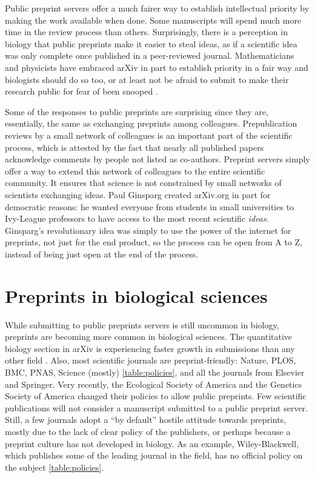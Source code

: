 \documentclass[letterpaper,twocolumn,superscriptaddress,showkeys]{revtex4}
\begin{document}
Public preprint servers offer a much fairer way to establish intellectual
priority by making the work available when done. Some manuscripts will spend
much more time in the review process than others. Surprisingly, there is a
perception in biology that public preprints make it easier to steal ideas, as if
a scientific idea was only complete once published in a peer-reviewed journal.
Mathematicians and physicists have embraced arXiv in part to establish priority
in a fair way and biologists should do so too, or at least not be afraid to
submit to make their research public for fear of been snooped \cite{cal12}.

Some of the responses to public preprints are surprising since they are,
essentially, the same as exchanging preprints among colleagues.  Prepublication
reviews by a small network of colleagues is an important part of the scientific
process, which is attested by the fact that nearly all published papers
acknowledge comments by people not listed as co-authors.  Preprint servers
simply offer a way to extend this network of colleagues to the entire scientific
community. It ensures that science is not constrained by small networks of
scientists exchanging ideas.  Paul Ginsparg created arXiv.org in part for
democratic reasons: he wanted everyone from students in small universities to
Ivy-League professors to have access to the most recent scientific \emph{ideas}.
Ginsparg's revolutionary idea was simply to use the power of the internet for
preprints, not just for the end product, so the process can be open from A to Z,
instead of being just open at the end of the process.

\section{Preprints in biological sciences}

While submitting to public preprints servers is still uncommon in biology,
preprints are becoming more common in biological sciences. The quantitative
biology section in arXiv is experiencing faster growth in submissions than any
other field \cite{cal12}. Also, most scientific journals are preprint-friendly:
Nature, PLOS, BMC, PNAS, Science (mostly) \ref{table:policies}, and all the
journals from Elsevier and Springer. Very recently, the Ecological Society of
America and the Genetics Society of America changed their policies to allow
public preprints. Few scientific publications will not consider a manuscript
submitted to a public preprint server.  Still, a few journals adopt a ``by
default'' hostile attitude towards preprints, mostly due to the lack of clear
policy of the publishers, or perhaps because a preprint culture has not
developed in biology. As an example, Wiley-Blackwell, which publishes some of
the leading journal in the field, has no official policy on the subject
\ref{table:policies}.
\end{document}
